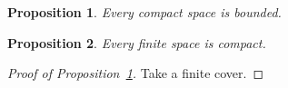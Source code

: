 \documentclass{article}
\newtheorem{proposition}{Proposition}
\newcommand{\prlabel}[1]{\label{pr:#1}}
\newcommand{\prref}[1]{Proposition~\ref{pr:#1}}
\begin{document}
\begin{proposition}\prlabel{bounded} Every compact space is bounded. \end{proposition}
\begin{proposition} Every finite space is compact. \end{proposition}

\begin{proof}[Proof of \prref{bounded}]
Take a finite cover.
\end{proof}
\end{document}
